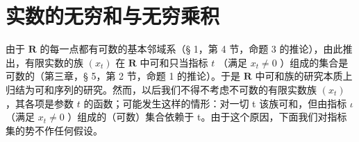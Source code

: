 \section{实数的无穷和与无穷乘积}

由于 \(\mathbf{R}\) 的每一点都有可数的基本邻域系（§ 1，第 4 节，命题 3 的推论），由此推出，有限实数的族 \((x_{t})\) 在 \(\mathbf{R}\) 中可和只当指标 \(t\) （满足 \(x_{t} \neq 0\) ）组成的集合是可数的（第三章，§ 5，第 2 节，命题 1 的推论）。于是 \(\mathbf{R}\) 中可和族的研究本质上归结为可和序列的研究。然而，以后我们不得不考虑不可数的有限实数族 \((x_{t})\) ，其各项是参数 \(t\) 的函数；可能发生这样的情形：对一切 t 该族可和，但由指标 \(\iota\) （满足 \(x_{t} \neq 0\) ）组成的（可数）集合依赖于 t。由于这个原因，下面我们对指标集的势不作任何假设。

